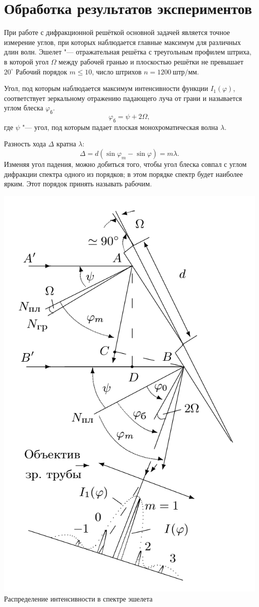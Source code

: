 \section*{Обработка результатов экспериментов}
При работе с дифракционной решёткой основной задачей является точное измерение углов, при которых наблюдается главные максимум для различных длин волн.
Эшелет "--- отражательная решётка с  треугольным профилем штриха, в которой угол $\Omega$ между рабочей гранью и плоскостью решётки не превышает $20^\circ$
Рабочий порядок $m \leq 10$, число штрихов $n = 1200\ штр/мм$.

Угол, под которым наблюдается максимум интенсивности функции $I_1 (\varphi)$, соответствует зеркальному отражению падающего луча от грани и называется углом блеска $\varphi_\text{б}$.
\[
    \varphi_\text{б} = \psi + 2 \Omega,
\]
где $\psi$ "--- угол, под которым падает плоская монохроматическая волна $\lambda$.

Разность хода $\Delta$ кратна $\lambda$:
\[
\Delta = d (\sin \varphi_m - \sin \varphi) = m \lambda.
\]
Изменяя угол падения, можно добиться того, чтобы угол блеска совпал с углом дифракции спектра одного из порядков; в этом порядке спектр будет наиболее ярким. Этот порядок принять называть рабочим.
\begin{center}
    \includegraphics[width = 0.5\linewidth]{3.png} \\
    {Распределение интенсивности в спектре эшелета}
\end{center}

